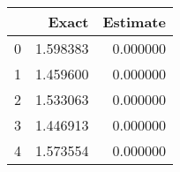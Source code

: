 \begin{tabular}{lrr}
\toprule
 & Exact & Estimate \\
\midrule
0 & 1.598383 & 0.000000 \\
1 & 1.459600 & 0.000000 \\
2 & 1.533063 & 0.000000 \\
3 & 1.446913 & 0.000000 \\
4 & 1.573554 & 0.000000 \\
\bottomrule
\end{tabular}
